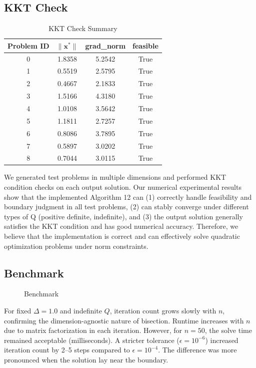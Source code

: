 \documentclass[12pt]{article}
\begin{document}
\subsection{KKT Check}
\begin{table}[h!]
\centering
\begin{tabular}{cccc}
\hline
\textbf{Problem ID} & \(\|\mathbf{x}^\ast\|\) & \textbf{grad\_norm} & \textbf{feasible} \\
\hline
0 & 1.8358 & 5.2542  & True  \\
1 & 0.5519 & 2.5795  & True  \\
2 & 0.4667 & 2.1833  & True  \\
3 & 1.5166 & 4.3180  & True  \\
4 & 1.0108 & 3.5642  & True  \\
5 & 1.1811 & 2.7257  & True  \\
6 & 0.8086 & 3.7895  & True  \\
7 & 0.5897 & 3.0202  & True  \\
8 & 0.7044 & 3.0115  & True  \\
\hline
\end{tabular}
\caption{KKT Check Summary}
\end{table}
We generated test problems in multiple dimensions and performed KKT condition checks on each output solution. Our numerical experimental results show that the implemented Algorithm 12 can (1) correctly handle feasibility and boundary judgment in all test problems, (2) can stably converge under different types of Q (positive definite, indefinite), and (3) the output solution generally satisfies the KKT condition and has good numerical accuracy. Therefore, we believe that the implementation is correct and can effectively solve quadratic optimization problems under norm constraints.

\subsection{Benchmark}

\begin{figure}[h]
    \centering
    \caption{Benchmark}
    \label{fig:6}
\end{figure}
\FloatBarrier
For fixed $\Delta=1.0$ and indefinite $Q$, iteration count grows slowly with $n$, confirming the dimension-agnostic nature of bisection. Runtime increases with $n$ due to matrix factorization in each iteration. However, for $n=50$, the solve time remained acceptable (milliseconds). A stricter tolerance ($\epsilon=10^{-6}$) increased iteration count by 2--5 steps compared to $\epsilon=10^{-4}$. The difference was more pronounced when the solution lay near the boundary.
\end{document}
